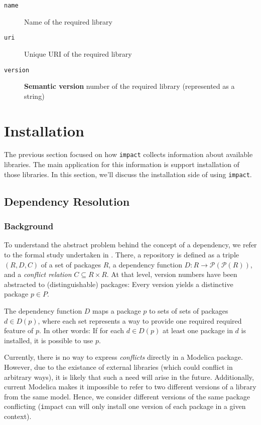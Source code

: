 \documentclass[11pt,a4paper,twocolumn]{article}
\newcommand{\code}[1]{\texttt{#1}} %
\begin{document}
\begin{description}
  \item[\code{name}] Name of the required library
  \item[\code{uri}] Unique URI of the required library
  \item[\code{version}] {\bf Semantic version} number of the required
    library (represented as a string)
\end{description}

\section{Installation}

The previous section focused on how \code{impact} collects information
about available libraries.  The main application for this information
is support installation of those libraries.  In this section, we'll
discuss the installation side of using \code{impact}.

\subsection{Dependency Resolution}

\subsubsection{Background}

To understand the abstract problem behind the concept of a dependency,
we refer to the formal study undertaken in \cite{boender2011formal}.
There, a repository is defined as a triple $(R,D,C)$ of a set of
packages $R$, a dependency function $D : R \rightarrow
\mathcal{P}(\mathcal{P}(R))$, and a {\em conflict relation} $C
\subseteq R \times R$.  At that level, version numbers have been
abstracted to (distinguishable) packages: Every version yields a
distinctive package $p \in P$.

The dependency function $D$ maps a package $p$ to sets of sets of
packages $d \in D(p)$, where each set represents a way to provide one
required required feature of $p$.  In other words: If for each $d \in
D(p)$ at least one package in $d$ is installed, it is possible to use
$p$.

Currently, there is no way to express {\em conflicts} directly in a
Modelica package.  However, due to the existance of external libraries
(which could conflict in arbitrary ways), it is likely that such a
need will arise in the future.  Additionally, current Modelica makes
it impossible to refer to two different versions of a library from the
same model.  Hence, we consider different versions of the same package
conflicting ({\code impact} can will only install one version of each
package in a given context).
\end{document}

